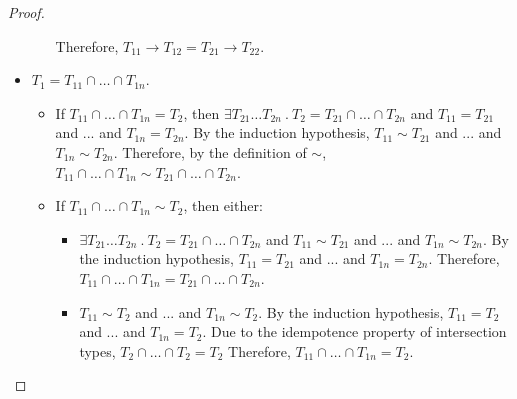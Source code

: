 \documentclass[a4paper]{article}
\begin{document}
\begin{proof}
\begin{itemize}
\begin{itemize}
        Therefore, $T_{11} \rightarrow T_{12} = T_{21} \rightarrow T_{22}$.
    \end{itemize}
    \item $T_1 = T_{11} \cap \ldots \cap T_{1n}$.
    \begin{itemize}
        \item If $T_{11} \cap \ldots \cap T_{1n} = T_2$, then $\exists T_{21} \ldots T_{2n}\ .\ T_2 = T_{21} \cap \ldots \cap T_{2n}$ and $T_{11} = T_{21}$ and ... and $T_{1n} = T_{2n}$.
        By the induction hypothesis, $T_{11} \sim T_{21}$ and ... and $T_{1n} \sim T_{2n}$.
        Therefore, by the definition of $\sim$, $T_{11} \cap \ldots \cap T_{1n} \sim T_{21} \cap \ldots \cap T_{2n}$.
        \item If $T_{11} \cap \ldots \cap T_{1n} \sim T_2$, then either:
        \begin{itemize}
            \item $\exists T_{21} \ldots T_{2n}\ .\ T_2 = T_{21} \cap \ldots \cap T_{2n}$ and $T_{11} \sim T_{21}$ and ... and $T_{1n} \sim T_{2n}$.
            By the induction hypothesis, $T_{11} = T_{21}$ and ... and $T_{1n} = T_{2n}$.
            Therefore, $T_{11} \cap \ldots \cap T_{1n} = T_{21} \cap \ldots \cap T_{2n}$.
            \item $T_{11} \sim T_2$ and ... and $T_{1n} \sim T_2$.
            By the induction hypothesis, $T_{11} = T_2$ and ... and $T_{1n} = T_2$.
            Due to the idempotence property of intersection types, $T_2 \cap \ldots \cap T_2 = T_2$
            Therefore, $T_{11} \cap \ldots \cap T_{1n} = T_2$.
        \end{itemize}
    \end{itemize}
\end{itemize}
\end{proof}
\end{document}
